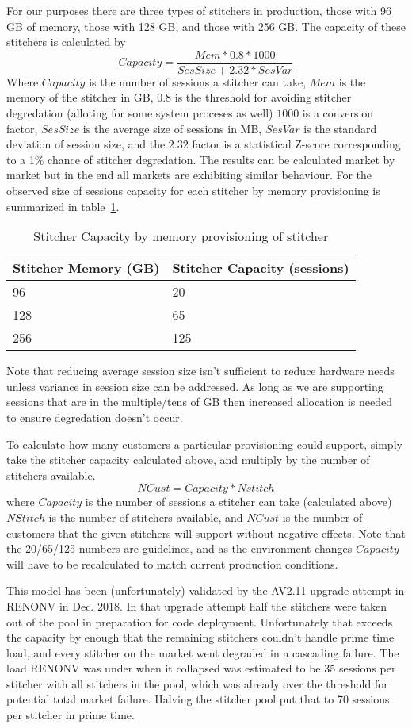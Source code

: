 \documentclass{article}
\begin{document}
For our purposes there are three types of stitchers in production, those with 96 GB of memory, those with 128 GB, and those with 256 GB. The capacity of these stitchers is calculated by $$Capacity=\frac{Mem * 0.8 * 1000}{SesSize + 2.32*SesVar}$$ Where $Capacity$ is the number of sessions a stitcher can take, $Mem$ is the memory of the stitcher in GB, $0.8$ is the threshold for avoiding stitcher degredation (alloting for some system proceses as well) $1000$ is a conversion factor, $SesSize$ is the average size of sessions in MB, $SesVar$ is the standard deviation of session size, and the $2.32$ factor is a statistical Z-score corresponding to a 1\% chance of stitcher degredation. The results can be calculated market by market but in the end all markets are exhibiting similar behaviour. For the observed size of sessions capacity for each stitcher by memory provisioning is summarized in table~\ref{TABLE-StitcherCapacity}.

\begin{table}[H]
\begin{tabular}{|l|l|} 
\hline Stitcher Memory (GB) & Stitcher Capacity (sessions) \\
\hline 96 & 20 \\
\hline 128 & 65 \\
\hline 256 & 125 \\
\hline 
\end{tabular}
\caption{\label{TABLE-StitcherCapacity}Stitcher Capacity by memory provisioning of stitcher}
\end{table}

Note that reducing average session size isn't sufficient to reduce hardware needs unless variance in session size can be addressed. As long as we are supporting sessions that are in the multiple/tens of GB then increased allocation is needed to ensure degredation doesn't occur. 

To calculate how many customers a particular provisioning could support, simply take the stitcher capacity calculated above, and multiply by the number of stitchers available. $$NCust=Capacity*Nstitch$$ where $Capacity$ is the number of sessions a stitcher can take (calculated above) $NStitch$ is the number of stitchers available, and $NCust$ is the number of customers that the given stitchers will support without negative effects. Note that the 20/65/125 numbers are guidelines, and as the environment changes $Capacity$ will have to be recalculated to match current production conditions. 

This model has been (unfortunately) validated by the AV2.11 upgrade attempt in RENONV in Dec. 2018. In that upgrade attempt half the stitchers were taken out of the pool in preparation for code deployment. Unfortunately that exceeds the capacity by enough that the remaining stitchers couldn't handle prime time load, and every stitcher on the market went degraded in a cascading failure. The load RENONV was under when it collapsed was estimated to be 35 sessions per stitcher with all stitchers in the pool, which was already over the threshold for potential total market failure. Halving the stitcher pool put that to 70 sessions per stitcher in prime time. 
\end{document}
